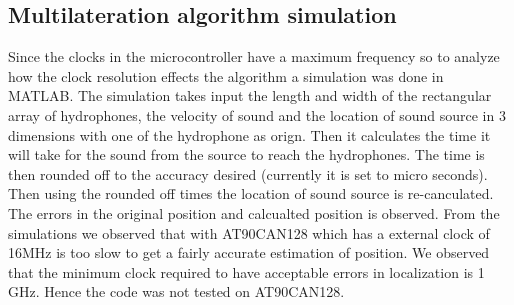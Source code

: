 \subsection{Multilateration algorithm simulation}
Since the clocks in the microcontroller have a maximum frequency so to analyze how the clock resolution effects the algorithm a simulation was done in MATLAB. The simulation takes input the length and width of the rectangular array of hydrophones, the velocity of sound and the location of sound source in 3 dimensions with one of the hydrophone as orign. Then it calculates the time it will take for the sound from the source to reach the hydrophones. The time is then rounded off to the accuracy desired (currently it is set to micro seconds). Then using the rounded off times the location of sound source is re-canculated. The errors in the original position and calcualted position is observed.\newline
From the simulations we observed that with AT90CAN128 which has a external clock of 16MHz is too slow to get a fairly accurate estimation of position. We observed that the minimum clock required to have acceptable errors in localization is 1 GHz. Hence the code was not tested on AT90CAN128.
%
